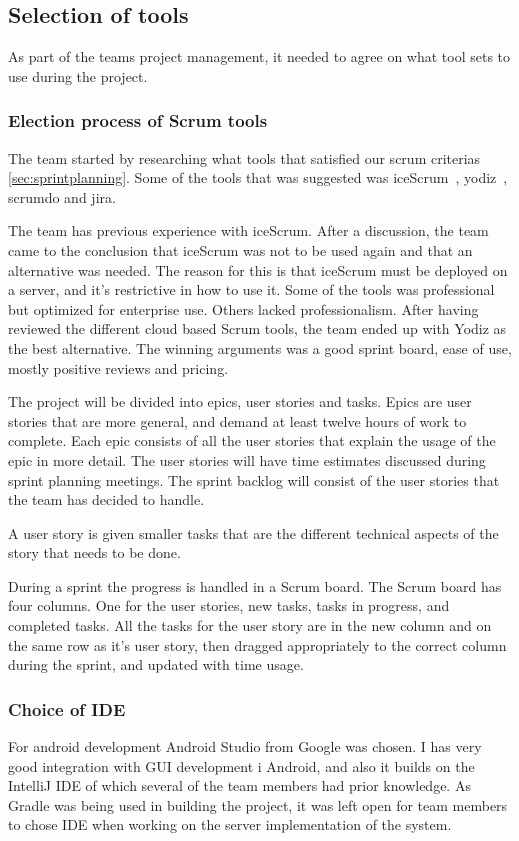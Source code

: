 \subsection{Selection of tools}
As part of the teams project management, it needed to agree on what tool sets to use during the project.
\subsubsection{Election process of Scrum tools}
\label{sec:scrumtools}
The team started by researching what tools that satisfied our scrum criterias \ref{sec:sprintplanning}. Some of the tools that was suggested was iceScrum~\cite{icescrum}, yodiz~\cite{yodiz}, scrumdo and jira.

The team has previous experience with iceScrum. After a discussion, the team came to the conclusion
that iceScrum was not to be used again and that an alternative was needed. The reason for this is that iceScrum must be deployed on a server, and it's restrictive in how to use it.
Some of the tools was professional but optimized for enterprise use. Others lacked professionalism.
After having reviewed the different cloud based Scrum tools, the team ended up with Yodiz as the best alternative. The winning arguments was a
good sprint board, ease of use, mostly positive reviews and pricing.

The project will be divided into epics, user stories and tasks. Epics are user stories that are more general,
and demand at least twelve hours of work to complete. Each epic consists
of all the user stories that explain the usage of the epic in more detail.
The user stories will have time estimates discussed during sprint planning meetings.
The sprint backlog will consist of the user stories that the team has decided to handle.

A user story is given smaller tasks that are the different technical aspects of the story that needs to be done.

During a sprint the progress is handled in a Scrum board. The Scrum board has four columns. One for the user stories, new tasks, tasks in progress, and completed tasks.
All the tasks for the user story are in the new column and on the same row as it's user story, then dragged appropriately to the correct column during the sprint, and updated with time usage.

\subsubsection{Choice of IDE}
For android development Android Studio from Google was chosen. I has very good integration with GUI development i Android, and also it builds on the IntelliJ IDE of which several of the team members had prior knowledge. As Gradle was being used in building the project, it was left open for team members to chose IDE when working on the server implementation of the system.

